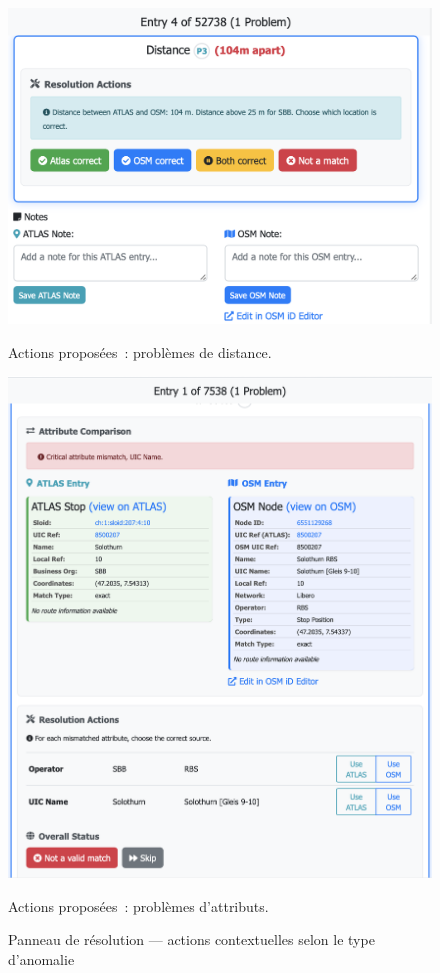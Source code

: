 \begin{figure}[h]
  \centering
  \begin{minipage}[b]{0.48\textwidth}
    \centering
    \includegraphics[width=\textwidth]{../figures/chap9/distance problem resolution actions.png}
    \caption*{Actions proposées : problèmes de distance.}
  \end{minipage}\hfill
  \begin{minipage}[b]{0.48\textwidth}
    \centering
    \includegraphics[width=\textwidth]{../figures/chap9/problem resolution actions attributes problem.png}
    \caption*{Actions proposées : problèmes d'attributs.}
  \end{minipage}
  \caption[Panneau de résolution]{Panneau de résolution — actions contextuelles selon le type d'anomalie}
\end{figure}

